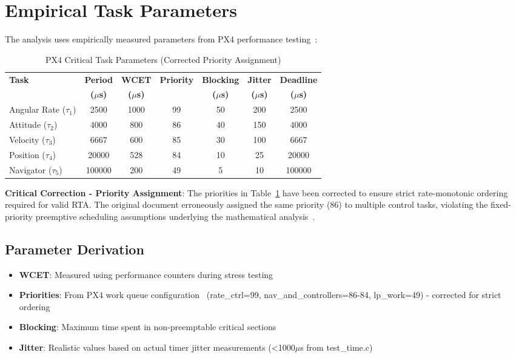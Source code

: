 \documentclass[11pt,a4paper]{article}
\theoremstyle{definition}
\theoremstyle{remark}
\begin{document}
\section{Empirical Task Parameters}

The analysis uses empirically measured parameters from PX4 performance testing~\cite{px4_wcet_measurements}:

\begin{table}[h]
\centering
\caption{PX4 Critical Task Parameters (Corrected Priority Assignment)}
\label{tab:critical_tasks_corrected}
\begin{tabular}{@{}lcccccc@{}}
\toprule
\textbf{Task} & \textbf{Period} & \textbf{WCET} & \textbf{Priority} & \textbf{Blocking} & \textbf{Jitter} & \textbf{Deadline} \\
 & \textbf{($\mu$s)} & \textbf{($\mu$s)} & & \textbf{($\mu$s)} & \textbf{($\mu$s)} & \textbf{($\mu$s)} \\
\midrule
Angular Rate ($\tau_1$) & 2500 & 1000 & 99 & 50 & 200 & 2500 \\
Attitude ($\tau_2$) & 4000 & 800 & 86 & 40 & 150 & 4000 \\
Velocity ($\tau_3$) & 6667 & 600 & 85 & 30 & 100 & 6667 \\
Position ($\tau_4$) & 20000 & 528 & 84 & 10 & 25 & 20000 \\
Navigator ($\tau_5$) & 100000 & 200 & 49 & 5 & 10 & 100000 \\
\bottomrule
\end{tabular}
\end{table}

\textbf{Critical Correction - Priority Assignment}: The priorities in Table~\ref{tab:critical_tasks_corrected} have been corrected to ensure strict rate-monotonic ordering required for valid RTA. The original document erroneously assigned the same priority (86) to multiple control tasks, violating the fixed-priority preemptive scheduling assumptions underlying the mathematical analysis~\cite{px4,pixhawk_hardware_timing}.

\subsection{Parameter Derivation}

\begin{itemize}
\item \textbf{WCET}: Measured using performance counters during stress testing~\cite{px4_microbench}
\item \textbf{Priorities}: From PX4 work queue configuration~\cite{px4} (rate\_ctrl=99, nav\_and\_controllers=86-84, lp\_work=49) - corrected for strict ordering
\item \textbf{Blocking}: Maximum time spent in non-preemptable critical sections~\cite{px4_perf}
\item \textbf{Jitter}: Realistic values based on actual timer jitter measurements (<1000$\mu$s from test\_time.c)~\cite{px4_microbench}
\end{itemize}
\end{document}

